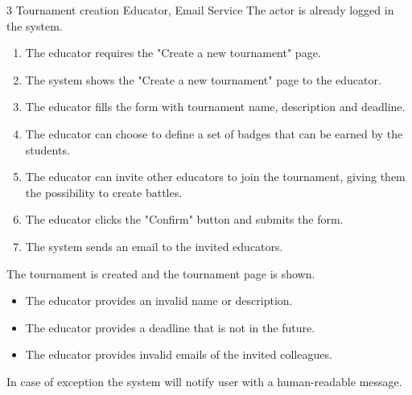\usecase
{3}
{Tournament creation}
{Educator, Email Service}
{The actor is already logged in the system.}
{
    \begin{enumerate}
        \item The educator requires the "Create a new tournament" page.
        \item The system shows the "Create a new tournament" page to the educator.
        \item The educator fills the form with tournament name, description and deadline.
        \item The educator can choose to define a set of badges that can be earned by the students.
        \item The educator can invite other educators to join the tournament, giving them the possibility to create battles.
        \item The educator clicks the "Confirm" button and submits the form. 
        \item The system sends an email to the invited educators.
    \end{enumerate}
}
{The tournament is created and the tournament page is shown.}
{
    \begin{itemize}
        \item The educator provides an invalid name or description.
        \item The educator provides a deadline that is not in the future.
        \item The educator provides invalid emails of the invited colleagues.
    \end{itemize}
}
{
    In case of exception the system will notify user with a human-readable message.
}

\clearpage

